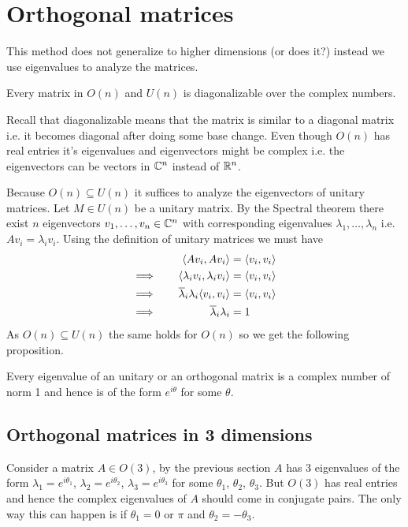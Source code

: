 \section{Orthogonal matrices}
This method does not generalize to higher dimensions (or does it?) instead we use eigenvalues to analyze the matrices.

\begin{thm}
	Every matrix in $O(n)$ and $U(n)$ is diagonalizable over the complex numbers.
\end{thm}
Recall that diagonalizable means that the matrix is similar to a diagonal matrix i.e. it becomes diagonal after doing some base change. Even though $O(n)$ has real entries it's eigenvalues and eigenvectors might be complex i.e. the eigenvectors can be vectors in $\mathbb{C}^n$ instead of $\mathbb{R}^n$.

Because $O(n) \subseteq U(n)$ it suffices to analyze the eigenvectors of unitary matrices. Let $M \in U(n)$ be a unitary matrix. By the Spectral theorem there exist $n$ eigenvectors $v_1, \ldots, v_n \in \mathbb{C}^n$ with corresponding eigenvalues $\lambda_1, \ldots, \lambda_n$ i.e. $A v_i = \lambda_i v_i$. Using the definition of unitary matrices we must have
\begin{alignat}{4}
	               &   & \langle Av_i, Av_i \rangle                         & = \langle v_i, v_i \rangle \\
	\implies \quad &   & \langle \lambda_i v_i, \lambda_i v_i \rangle       & = \langle v_i, v_i \rangle \\
	\implies \quad &   & \overline{\lambda}_i \lambda_i \langle v_i, v_i \rangle & = \langle v_i, v_i \rangle \\
	\implies \quad &   & \overline{\lambda}_i \lambda_i                   & = 1
\end{alignat}
As $O(n)	\subseteq U(n)$ the same holds for $O(n)$ so we get the following proposition.

\begin{proposition}
	Every eigenvalue of an unitary or an orthogonal matrix is a complex number of norm 1 and hence is of the form $e^{i \theta}$ for some $\theta$.
\end{proposition}


\subsection{Orthogonal matrices in 3 dimensions}
Consider a matrix $A \in O(3)$, by the previous section $A$ has 3 eigenvalues of the form $\lambda_1 = e^{i \theta_1}$, $\lambda_2 = e^{i \theta_2}$, $\lambda_3 = e^{i \theta_3}$ for some $\theta_1$, $\theta_2$, $\theta_3$. But $O(3)$ has real entries and hence the complex eigenvalues of $A$ should come in conjugate pairs. The only way this can happen is if $\theta_1 = 0$ or $\pi$ and $\theta_2 = - \theta_3$.

